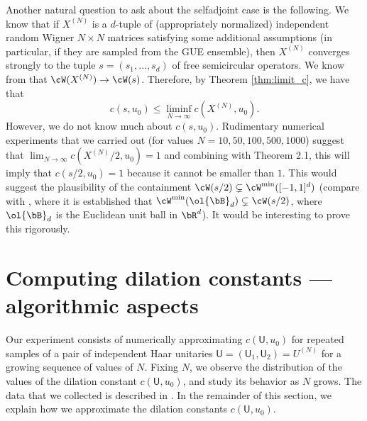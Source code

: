 \begin{remark}
Another natural question to ask about the selfadjoint case is the following. We know that if $X^{(N)}$ is a $d$-tuple of (appropriately normalized) independent random Wigner $N \times N$ matrices satisfying some additional assumptions (in particular, if they are sampled from the GUE ensemble), then $X^{(N)}$ converges strongly to the tuple $s = (s_1, \ldots, s_d)$ of free semicircular operators. 
We know from \cite[Theorem 3.2]{GSh21} that $\cW(X^{(N)}) \to \cW(s)$. Therefore, by Theorem \ref{thm:limit_c}, we have that 
\[  
c(s,u_0)\leq \liminf_{N\to\infty} c(X^{(N)},u_0).
\]
However, we do not know much about $c(s,u_0)$. Rudimentary numerical experiments that we carried out (for values $N = 10, 50, 100, 500, 1000$) suggest that $\lim_{N\to\infty} c(X^{(N)}/2,u_0) = 1$ and combining with Theorem 2.1, this will imply that $c(s/2,u_0) = 1$ because it cannot be smaller than $1$.  
This would suggest the plausibility of the containment $\cW(s/2) \subsetneq \cW^{\operatorname{min}}([-1,1]^d)$ (compare with \cite[Theorem 5.4]{GSh21}, where it is established that $\cW^{\operatorname{min}}(\ol{\bB}_d) \subsetneq \cW(s/2)$, where $\ol{\bB}_d$ is the Euclidean unit ball in $\bR^d$). It would be interesting to prove this rigorously.
\end{remark}


\section{Computing dilation constants --- algorithmic aspects}\label{sec:algorithmic}

Our experiment consists of numerically approximating $c(\mathsf{U},u_0)$ for repeated samples of a pair of independent Haar unitaries $\mathsf{U} = (\mathsf{U}_1, \mathsf{U}_2)  = U^{(N)}$ for a growing sequence of values of $N$. Fixing $N$, we observe the distribution of the values of the dilation constant $c(\mathsf{U},u_0)$, and study its behavior as $N$ grows. 
The data that we collected is described in . In the remainder of this section, we explain how we approximate the dilation constants $c(\mathsf{U},u_0)$. 

